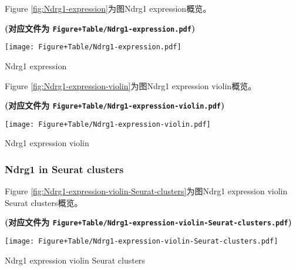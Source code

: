 \documentclass[
]{article}
\begin{document}
Figure \ref{fig:Ndrg1-expression}为图Ndrg1 expression概览。

\textbf{(对应文件为 \texttt{Figure+Table/Ndrg1-expression.pdf})}

\def\@captype{figure}
\begin{center}
\texttt{[image: Figure+Table/Ndrg1-expression.pdf]}
\caption{Ndrg1 expression}\label{fig:Ndrg1-expression}
\end{center}

Figure \ref{fig:Ndrg1-expression-violin}为图Ndrg1 expression violin概览。

\textbf{(对应文件为 \texttt{Figure+Table/Ndrg1-expression-violin.pdf})}

\def\@captype{figure}
\begin{center}
\texttt{[image: Figure+Table/Ndrg1-expression-violin.pdf]}
\caption{Ndrg1 expression violin}\label{fig:Ndrg1-expression-violin}
\end{center}

\hypertarget{ndrg1-in-seurat-clusters}{%
\subsubsection{Ndrg1 in Seurat clusters}\label{ndrg1-in-seurat-clusters}}

Figure \ref{fig:Ndrg1-expression-violin-Seurat-clusters}为图Ndrg1 expression violin Seurat clusters概览。

\textbf{(对应文件为 \texttt{Figure+Table/Ndrg1-expression-violin-Seurat-clusters.pdf})}

\def\@captype{figure}
\begin{center}
\texttt{[image: Figure+Table/Ndrg1-expression-violin-Seurat-clusters.pdf]}
\caption{Ndrg1 expression violin Seurat clusters}\label{fig:Ndrg1-expression-violin-Seurat-clusters}
\end{center}
\end{document}
